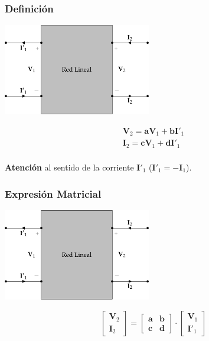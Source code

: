 \subsubsection{Definición}
\label{sec:org52b179c}
\begin{center}
\includegraphics[height=4cm]{../figs/cuadripolo_transmision_inversa.pdf}
\end{center}

\[
\begin{array}{l}
  \mathbf{V}_2 = \mathbf{a} \mathbf{V}_1 + \mathbf{b}\mathbf{I'}_1\\
  \mathbf{I}_2 = \mathbf{c} \mathbf{V}_1 + \mathbf{d} \mathbf{I'}_1\\
\end{array}
\]

\begin{center}
\textbf{Atención} al sentido de la corriente \(\mathbf{I'}_1\) (\(\mathbf{I'}_1 = - \mathbf{I}_1\)).
\end{center}

\subsubsection{Expresión Matricial}
\label{sec:orgca7fb03}
\begin{center}
\includegraphics[height=4cm]{../figs/cuadripolo_transmision_inversa.pdf}
\end{center}

\[
  \left[
    \begin{array}{c}
      \mathbf{V}_2\\
      \mathbf{I}_2
    \end{array}
  \right] =
  \left[
    \begin{array}{cc}
      \mathbf{a} & \mathbf{b}\\
      \mathbf{c} & \mathbf{d}
    \end{array}
  \right] \cdot
  \left[
    \begin{array}{c}
      \mathbf{V}_1\\
      \mathbf{I'}_1
    \end{array}
  \right]
\]

